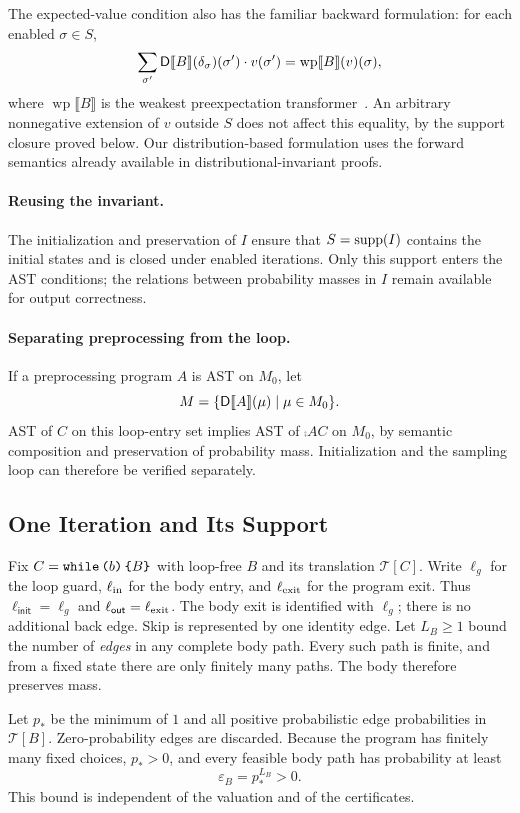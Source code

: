 The expected-value condition also has the familiar backward formulation:
for each enabled $\sigma\in S$,
\[
 \sum_{\sigma'}\mathsf{D}\llbracket B\rrbracket(\delta_{\sigma})(\sigma') \cdot v(\sigma')
 =\operatorname{wp}\llbracket B\rrbracket(v)(\sigma),
\]
where $\operatorname{wp}\llbracket B\rrbracket$ is the weakest
preexpectation transformer~\cite{DBLP:series/mcs/McIverM05}.
An arbitrary nonnegative extension of $v$ outside $S$
does not affect this equality, by the support closure proved below.
Our distribution-based formulation uses the forward semantics already
available in distributional-invariant proofs.

\paragraph{Reusing the invariant.}
The initialization and preservation of $I$ ensure that $S=\textnormal{supp}(I)$
contains the initial states and is closed under enabled iterations.
Only this support enters the AST conditions; the relations between
probability masses in $I$ remain available for output correctness.

\paragraph{Separating preprocessing from the loop.}
If a preprocessing program $A$ is AST on $M_0$, let
\[
 M=\{\mathsf{D}\llbracket A\rrbracket(\mu)\mid\mu\in M_0\}.
\]
AST of $C$ on this loop-entry set implies AST of $\comp{A}{C}$ on
$M_0$, by semantic composition and preservation of probability mass.
Initialization and the sampling loop can therefore be verified separately.

\subsection{One Iteration and Its Support}

Fix $C=\textnormal{\texttt{while}}\,\textnormal{\texttt{(}} b\textnormal{\texttt{)}}\,\textnormal{\texttt{\{}} B\textnormal{\texttt{\}}}$ with loop-free $B$ and its translation
$\mathcal T[C]$. Write $\ell_g$ for the loop guard,
$\ell_{\rm in}$ for the body entry, and $\ell_{\rm exit}$ for the program
exit. Thus $\ell_{\mathsf{init}}=\ell_g$ and
$\ell_{\mathsf{out}}=\ell_{\rm exit}$. The body exit is identified with $\ell_g$;
there is no additional back edge. Skip is represented by one identity
edge. Let $L_B\geq1$ bound the number of \emph{edges} in any complete body
path. Every such path is finite, and from a fixed state there are only
finitely many paths. The body therefore preserves mass.

Let $p_*$ be the minimum of $1$ and all positive probabilistic edge
probabilities in $\mathcal T[B]$. Zero-probability edges are discarded.
Because the program has finitely many fixed choices, $p_*>0$, and every
feasible body path has probability at least
\begin{equation}
 \varepsilon_B=p_*^{L_B}>0.
 \label{eq:body-path-bound}
\end{equation}
This bound is independent of the valuation and of the certificates.

